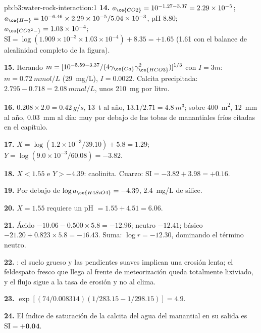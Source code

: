 \begin{solution}{pb:b3:water-rock-interaction:1}
\textbf{14.} $a_{\ce{CO2}} = 10^{-1.27 - 3.37} = 2.29\times10^{-5}$;
$a_{\ce{H+}} = 10^{-6.46}\times2.29\times10^{-5}/5.04\times10^{-3}$, pH 8.80;
$a_{\ce{CO3^2-}} = 1.03\times10^{-4}$; $\mathrm{SI} = \log(1.909\times
10^{-3}\times1.03\times10^{-4}) + 8.35 = +1.65$ (1.61 con el balance de
alcalinidad completo de la figura).

\textbf{15.} Iterando $m = [10^{-5.59 - 3.37}/(4\gamma_{\ce{Ca}}
\gamma_{\ce{HCO3}}^2)]^{1/3}$ con $I = 3m$: $m = \qty{0.72}{mmol/L}$
(\qty{29}{mg/L}), $I = 0.0022$. Calcita precipitada: $2.795 - 0.718 =
\qty{2.08}{mmol/L}$, unos \qty{210}{mg} por litro.

\textbf{16.} $0.208\times2.0 = \qty{0.42}{g/s}$, \qty{13}{t} al año,
$13.1/2.71 = \qty{4.8}{m^3}$; sobre \qty{400}{m^2}, \qty{12}{mm} al año,
\qty{0.03}{mm} al día: muy por debajo de las tobas de manantiales fríos citadas en el capítulo.

\textbf{17.} $X = \log(1.2\times10^{-3}/39.10) + 5.8 = 1.29$; $Y =
\log(9.0\times10^{-3}/60.08) = -3.82$.

\textbf{18.} $X < 1.55$ e $Y > -4.39$: caolinita. Cuarzo: $\mathrm{SI} =
-3.82 + 3.98 = +0.16$.

\textbf{19.} Por debajo de $\log a_{\ce{H4SiO4}} = -4.39$, \qty{2.4}{mg/L} de
sílice.

\textbf{20.} $X = 1.55$ requiere un pH $= 1.55 + 4.51 = 6.06$.

\textbf{21.} Ácido $-10.06 - 0.500\times5.8 = -12.96$; neutro $-12.41$; básico
$-21.20 + 0.823\times5.8 = -16.43$. Suma: $\log r = -12.30$, dominando el término
neutro.

\textbf{22.} : el suelo grueso y las pendientes suaves
implican una erosión lenta; el feldespato fresco que llega al frente de
meteorización queda totalmente lixiviado, y el flujo sigue a la tasa de erosión y no al clima.

\textbf{23.} $\exp[(74/0.008314)(1/283.15 - 1/298.15)] = 4.9$.

\textbf{24.} El índice de saturación de la calcita del agua del manantial en su
salida es $\mathrm{SI} = \textbf{+0.04}$.
\end{solution}

